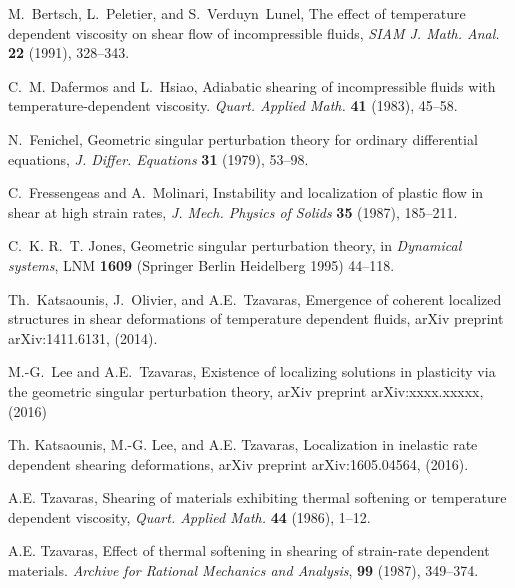 \documentclass[a4paper,11pt]{article}
\begin{document}
\begin{thebibliography}{10}

{\sc M.~Bertsch, L.~Peletier, and S.~Verduyn~Lunel}, 
The effect of temperature dependent viscosity on shear flow of  incompressible fluids,
{\em SIAM J. Math. Anal.} {\bf 22 } (1991), 328--343.

{\sc C.~M. Dafermos and L.~Hsiao}, 
Adiabatic shearing of incompressible fluids with temperature-dependent viscosity.
{\em Quart.  Applied Math.} {\bf 41} (1983), 45--58.

{\sc N.~Fenichel}, 
Geometric singular perturbation theory for ordinary differential equations, 
{\it J. Differ. Equations} {\bf 31} (1979), 53--98.

{\sc C.~Fressengeas and A.~Molinari}, 
Instability and localization of plastic flow in shear at high strain rates, 
  {\em J.  Mech. Physics of Solids} {\bf 35} (1987), 185--211.

{\sc C.~K. R.~T. Jones}, 
Geometric singular perturbation theory, in {\it Dynamical systems}, LNM {\bf 1609} (Springer Berlin Heidelberg 1995) 44--118.
  
  
{\sc Th.~Katsaounis, J.~Olivier, and A.E.~Tzavaras}, 
Emergence of coherent localized structures in shear deformations of
  temperature dependent fluids, arXiv preprint arXiv:1411.6131,  (2014).

{\sc M.-G.~Lee and A.E.~Tzavaras},
Existence of localizing solutions in plasticity via the geometric singular perturbation theory, arXiv preprint arXiv:xxxx.xxxxx,  (2016)

{\sc Th. Katsaounis, M.-G. Lee, and A.E. Tzavaras}, 
Localization in inelastic rate dependent shearing deformations, arXiv preprint arXiv:1605.04564,  (2016).


{\sc A.E. Tzavaras},
Shearing of materials exhibiting thermal softening or temperature dependent viscosity,
{\em Quart.  Applied Math.} {\bf 44} (1986), 1--12.

{\sc A.E. Tzavaras}, 
Effect of thermal softening in shearing of strain-rate dependent materials.
{\em Archive for Rational Mechanics and Analysis}, {\bf 99} (1987), 349--374.


\end{thebibliography}
\end{document}
